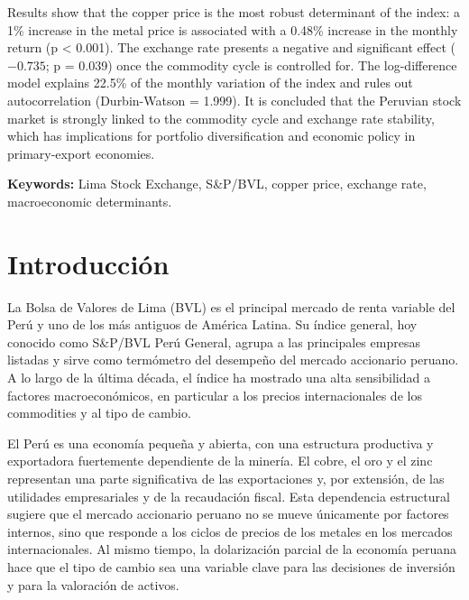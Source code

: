 \documentclass[12pt, a4paper]{article}
\begin{document}
Results show that the copper price is the most robust determinant of the index: a 1\% increase in the metal price is associated with a 0.48\% increase in the monthly return (p < 0.001). The exchange rate presents a negative and significant effect ($-0.735$; p = 0.039) once the commodity cycle is controlled for. The log-difference model explains 22.5\% of the monthly variation of the index and rules out autocorrelation (Durbin-Watson = 1.999). It is concluded that the Peruvian stock market is strongly linked to the commodity cycle and exchange rate stability, which has implications for portfolio diversification and economic policy in primary-export economies.

\vspace{0.5cm}
\noindent\textbf{Keywords:} Lima Stock Exchange, S\&P/BVL, copper price, exchange rate, macroeconomic determinants.
\newpage
\tableofcontents

\newpage
\section{Introducción}

La Bolsa de Valores de Lima (BVL) es el principal mercado de renta variable del Perú y uno de los más antiguos de América Latina. Su índice general, hoy conocido como S\&P/BVL Perú General, agrupa a las principales empresas listadas y sirve como termómetro del desempeño del mercado accionario peruano. A lo largo de la última década, el índice ha mostrado una alta sensibilidad a factores macroeconómicos, en particular a los precios internacionales de los commodities y al tipo de cambio.

El Perú es una economía pequeña y abierta, con una estructura productiva y exportadora fuertemente dependiente de la minería. El cobre, el oro y el zinc representan una parte significativa de las exportaciones y, por extensión, de las utilidades empresariales y de la recaudación fiscal. Esta dependencia estructural sugiere que el mercado accionario peruano no se mueve únicamente por factores internos, sino que responde a los ciclos de precios de los metales en los mercados internacionales. Al mismo tiempo, la dolarización parcial de la economía peruana hace que el tipo de cambio sea una variable clave para las decisiones de inversión y para la valoración de activos.
\end{document}
